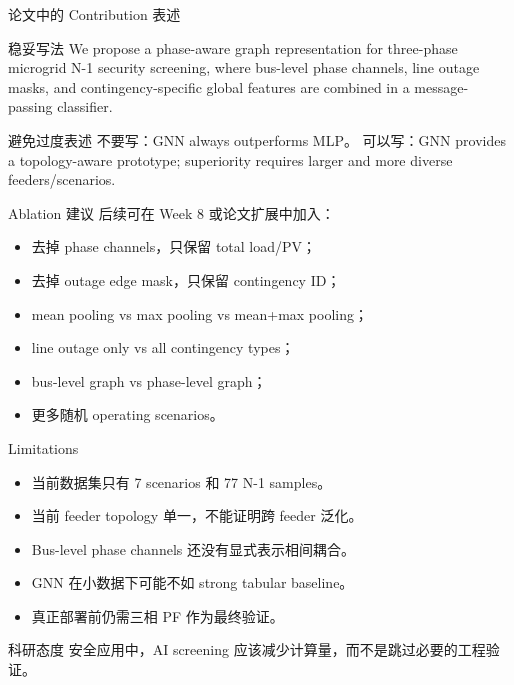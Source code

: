 \documentclass[aspectratio=169,11pt]{beamer}
\begin{document}
\begin{frame}{论文中的 Contribution 表述}
\begin{block}{稳妥写法}
We propose a phase-aware graph representation for three-phase microgrid N-1 security screening, where bus-level phase channels, line outage masks, and contingency-specific global features are combined in a message-passing classifier.
\end{block}
\begin{block}{避免过度表述}
不要写：GNN always outperforms MLP。\newline
可以写：GNN provides a topology-aware prototype; superiority requires larger and more diverse feeders/scenarios.
\end{block}
\end{frame}

\begin{frame}{Ablation 建议}
后续可在 Week 8 或论文扩展中加入：
\begin{itemize}
  \item 去掉 phase channels，只保留 total load/PV；
  \item 去掉 outage edge mask，只保留 contingency ID；
  \item mean pooling vs max pooling vs mean+max pooling；
  \item line outage only vs all contingency types；
  \item bus-level graph vs phase-level graph；
  \item 更多随机 operating scenarios。
\end{itemize}
\end{frame}

\begin{frame}{Limitations}
\begin{itemize}
  \item 当前数据集只有 7 scenarios 和 77 N-1 samples。
  \item 当前 feeder topology 单一，不能证明跨 feeder 泛化。
  \item Bus-level phase channels 还没有显式表示相间耦合。
  \item GNN 在小数据下可能不如 strong tabular baseline。
  \item 真正部署前仍需三相 PF 作为最终验证。
\end{itemize}
\begin{alertblock}{科研态度}
安全应用中，AI screening 应该减少计算量，而不是跳过必要的工程验证。
\end{alertblock}
\end{frame}
\end{document}
